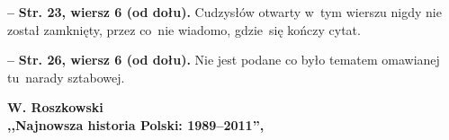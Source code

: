 \documentclass[a4paper,11pt]{article}
\newcommand{\spaceOne}{2em}
\newcommand{\tb}{\textbf}
\newcommand{\noi}{\noindent}
\newcommand{\start}{\noi \tb{--} {}}
\newcommand{\Center}[1]{\begin{center} #1 \end{center}}
\newcommand{\CenterTB}[1]{\Center{\tb{#1}}}
\newcommand{\Str}[1]{\tb{Str. #1.}}
\newcommand{\StrWd}[2]{\tb{Str. #1, wiersz #2 (od dołu).}}
\newcommand{\Work}[1]{ \begin{center} {\large \tb{#1}} \end{center} }
\begin{document}
\start \StrWd{23}{6} Cudzysłów otwarty w~tym wierszu nigdy nie został
zamknięty, przez co~nie wiadomo, gdzie~się kończy cytat.

\start \StrWd{26}{6} Nie jest podane co było tematem omawianej
tu~narady sztabowej.



\vspace{\spaceOne}



\Work{
  W. Roszkowski \\
  ,,Najnowsza historia Polski: 1989--2011'', \cite{Ros11g} }



\end{document}
